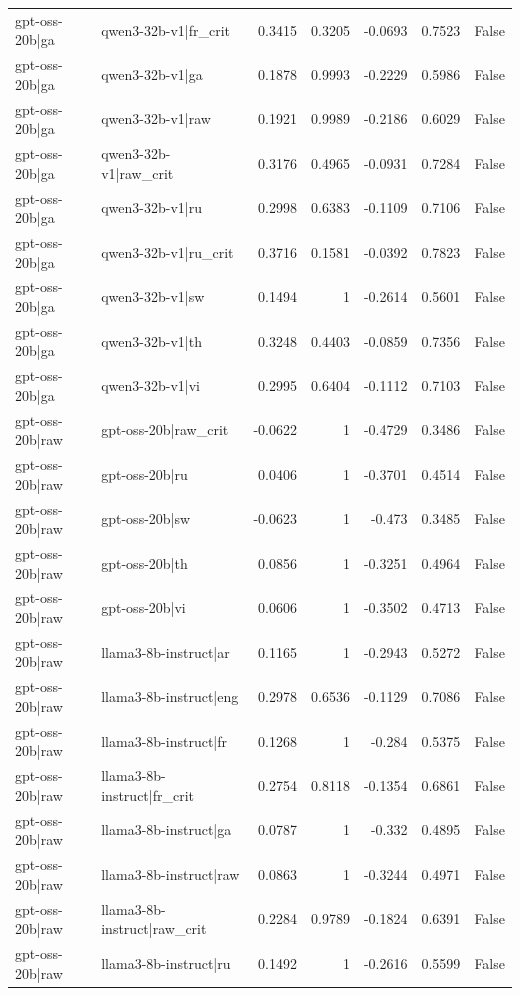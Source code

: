\begin{table}
\begin{tabular}{l l r r r r l}
gpt-oss-20b|ga & qwen3-32b-v1|fr_crit & 0.3415 & 0.3205 & -0.0693 & 0.7523 & False \\
gpt-oss-20b|ga & qwen3-32b-v1|ga & 0.1878 & 0.9993 & -0.2229 & 0.5986 & False \\
gpt-oss-20b|ga & qwen3-32b-v1|raw & 0.1921 & 0.9989 & -0.2186 & 0.6029 & False \\
gpt-oss-20b|ga & qwen3-32b-v1|raw_crit & 0.3176 & 0.4965 & -0.0931 & 0.7284 & False \\
gpt-oss-20b|ga & qwen3-32b-v1|ru & 0.2998 & 0.6383 & -0.1109 & 0.7106 & False \\
gpt-oss-20b|ga & qwen3-32b-v1|ru_crit & 0.3716 & 0.1581 & -0.0392 & 0.7823 & False \\
gpt-oss-20b|ga & qwen3-32b-v1|sw & 0.1494 & 1 & -0.2614 & 0.5601 & False \\
gpt-oss-20b|ga & qwen3-32b-v1|th & 0.3248 & 0.4403 & -0.0859 & 0.7356 & False \\
gpt-oss-20b|ga & qwen3-32b-v1|vi & 0.2995 & 0.6404 & -0.1112 & 0.7103 & False \\
gpt-oss-20b|raw & gpt-oss-20b|raw_crit & -0.0622 & 1 & -0.4729 & 0.3486 & False \\
gpt-oss-20b|raw & gpt-oss-20b|ru & 0.0406 & 1 & -0.3701 & 0.4514 & False \\
gpt-oss-20b|raw & gpt-oss-20b|sw & -0.0623 & 1 & -0.473 & 0.3485 & False \\
gpt-oss-20b|raw & gpt-oss-20b|th & 0.0856 & 1 & -0.3251 & 0.4964 & False \\
gpt-oss-20b|raw & gpt-oss-20b|vi & 0.0606 & 1 & -0.3502 & 0.4713 & False \\
gpt-oss-20b|raw & llama3-8b-instruct|ar & 0.1165 & 1 & -0.2943 & 0.5272 & False \\
gpt-oss-20b|raw & llama3-8b-instruct|eng & 0.2978 & 0.6536 & -0.1129 & 0.7086 & False \\
gpt-oss-20b|raw & llama3-8b-instruct|fr & 0.1268 & 1 & -0.284 & 0.5375 & False \\
gpt-oss-20b|raw & llama3-8b-instruct|fr_crit & 0.2754 & 0.8118 & -0.1354 & 0.6861 & False \\
gpt-oss-20b|raw & llama3-8b-instruct|ga & 0.0787 & 1 & -0.332 & 0.4895 & False \\
gpt-oss-20b|raw & llama3-8b-instruct|raw & 0.0863 & 1 & -0.3244 & 0.4971 & False \\
gpt-oss-20b|raw & llama3-8b-instruct|raw_crit & 0.2284 & 0.9789 & -0.1824 & 0.6391 & False \\
gpt-oss-20b|raw & llama3-8b-instruct|ru & 0.1492 & 1 & -0.2616 & 0.5599 & False \\

\end{tabular}
\end{table}
